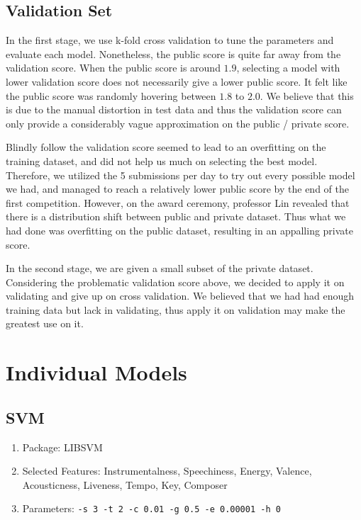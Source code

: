 \documentclass[10pt,letterpaper]{article}
\begin{document}
\subsection{Validation Set}

In the first stage, we use k-fold cross validation to tune the parameters and evaluate each model. Nonetheless, the public score is quite far away from the validation score. When the public score is around $1.9$, selecting a model with lower validation score does not necessarily give a lower public score. It felt like the public score was randomly hovering between $1.8$ to $2.0$. We believe that this is due to the manual distortion in test data and thus the validation score can only provide a considerably vague approximation on the public / private score.

Blindly follow the validation score seemed to lead to an overfitting on the training dataset, and did not help us much on selecting the best model. Therefore, we utilized the 5 submissions per day to try out every possible model we had, and managed to reach a relatively lower public score by the end of the first competition. However, on the award ceremony, professor Lin revealed that there is a distribution shift between public and private dataset. Thus what we had done was overfitting on the public dataset, resulting in an appalling private score. 

In the second stage, we are given a small subset of the private dataset. Considering the problematic validation score above, we decided to apply it on validating and give up on cross validation. We believed that we had had enough training data but lack in validating, thus apply it on validation may make the greatest use on it. 


\section{Individual Models}
\subsection{SVM}
\begin{enumerate}
	\item Package: LIBSVM
	\item Selected Features: Instrumentalness, Speechiness, Energy, Valence, Acousticness, Liveness, Tempo, Key, Composer
	\item Parameters: \texttt{-s 3 -t 2 -c 0.01 -g 0.5 -e 0.00001 -h 0}
\end{enumerate}
\end{document}
